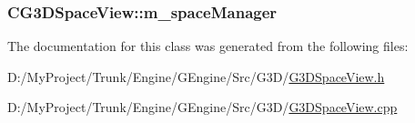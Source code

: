 \subsubsection[{m\+\_\+space\+Manager}]{ C\+G3\+D\+Space\+View\+::m\+\_\+space\+Manager\hspace{0.3cm}{\ttfamily [protected]}}\label{class_c_g3_d_space_view_add0273d1c28e0d7370498aa953da1824}


The documentation for this class was generated from the following files\+:\begin{DoxyCompactItemize}
\item 
D\+:/\+My\+Project/\+Trunk/\+Engine/\+G\+Engine/\+Src/\+G3\+D/\hyperlink{_g3_d_space_view_8h}{G3\+D\+Space\+View.\+h}\item 
D\+:/\+My\+Project/\+Trunk/\+Engine/\+G\+Engine/\+Src/\+G3\+D/\hyperlink{_g3_d_space_view_8cpp}{G3\+D\+Space\+View.\+cpp}\end{DoxyCompactItemize}
